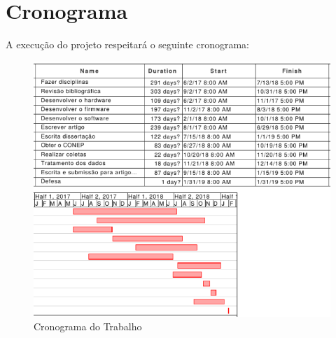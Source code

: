 \section{Cronograma}

A execução do projeto respeitará o seguinte cronograma:

\begin{figure}[H]
	\centering
	\includegraphics[width=1\textwidth]{cronograma/cronograma.png}
	\caption{Cronograma do Trabalho}
	\label{fig:cronograma}
\end{figure}